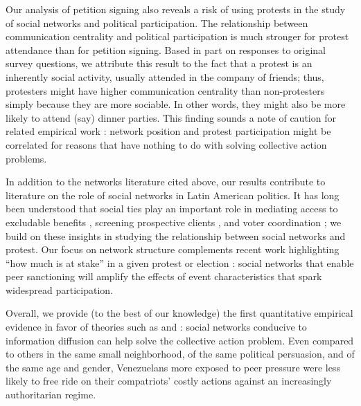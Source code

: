 \documentclass[12pt]{article}
\begin{document}
Our analysis of petition signing also reveals a risk of using protests in the study of social networks and political participation. The relationship between communication centrality and political participation is much stronger for protest attendance than for petition signing. Based in part on responses to original survey questions, we attribute this result to the fact that a protest is an inherently social activity, usually attended in the company of friends; thus, protesters might have higher communication centrality than non-protesters simply because they are more sociable. In other words, they might also be more likely to attend (say) dinner parties. This finding sounds a note of caution for related empirical work \citep[c.f.][]{Gonzalez2017, Larson:2016vk}: network position and protest participation might be correlated for reasons that have nothing to do with solving collective action problems.

In addition to the networks literature cited above, our results contribute to literature on the role of social networks in Latin American politics. It has long been understood that social ties play an important role in mediating access to excludable benefits \citep{CalvoMurillo,BrokersVoters}, screening prospective clients \citep{Auyero2000, UjhelyiCalvo}, and voter coordination \citep{AriasAPSR}; we build on these insights in studying the relationship between social networks and protest. Our focus on network structure complements recent work highlighting ``how much is at stake'' in a given protest or election \citep[][38--39]{AytacStokes}: social networks that enable peer sanctioning will amplify the effects of event characteristics that spark widespread participation.

Overall, we provide (to the best of our knowledge) the first quantitative empirical evidence in favor of theories such as \citet{Larson:2014ve} and \citet{JacksonJEL}: social networks conducive to information diffusion can help solve the collective action problem. Even compared to others in the same small neighborhood, of the same political persuasion, and of the same age and gender, Venezuelans more exposed to peer pressure were less likely to free ride on their compatriots' costly actions against an increasingly authoritarian regime.








\end{document}
